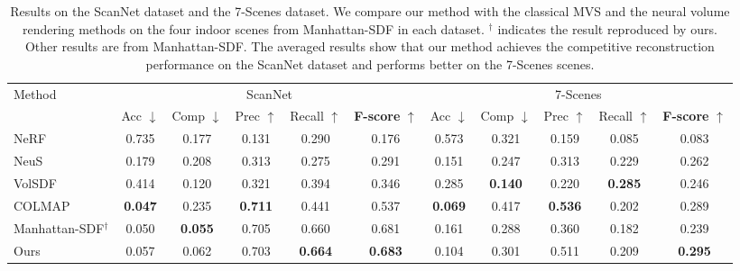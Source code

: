 \documentclass[10pt,journal,compsoc]{IEEEtran}
\begin{document}
\begin{table*}[htbp]
	\centering
	\small
	\renewcommand{\tabcolsep}{1.5ex}
	\caption{Results on the ScanNet dataset and the 7-Scenes dataset. We compare our method with the classical MVS and the neural volume rendering methods on the four indoor scenes from Manhattan-SDF \cite{guo2022neural} in each dataset. $^\dag$ indicates the result reproduced by ours. Other results are from Manhattan-SDF. The averaged results show that our method achieves the competitive reconstruction performance on the ScanNet dataset and performs better on the 7-Scenes scenes.}
	\begin{tabular}{l|ccccc|ccccc}
		\toprule
		\multirow{2}{*}{Method} & \multicolumn{5}{c|}{ScanNet} & \multicolumn{5}{c}{7-Scenes} \\
		\cmidrule{2-11}
		& Acc $\downarrow$ & Comp $\downarrow$ & Prec $\uparrow$ & Recall $\uparrow$ & \textbf{F-score} $\uparrow$ & Acc $\downarrow$ & Comp $\downarrow$ & Prec $\uparrow$ & Recall $\uparrow$ & \textbf{F-score} $\uparrow$ \\
		\midrule
		NeRF \cite{mildenhall2021nerf}    & 0.735 & 0.177 & 0.131 & 0.290 & 0.176 & 0.573 & 0.321 & 0.159 & 0.085 & 0.083 \\
		NeuS \cite{wang2021neus}          & 0.179 & 0.208 & 0.313 & 0.275 & 0.291 & 0.151 & 0.247 & 0.313 & 0.229 & 0.262 \\
		VolSDF \cite{yariv2021volume}     & 0.414 & 0.120 & 0.321 & 0.394 & 0.346 & 0.285  & \textbf{0.140} & 0.220 & \textbf{0.285} & 0.246 \\
		COLMAP \cite{schoenberger2016sfm} & \textbf{0.047} & 0.235 & \textbf{0.711} & 0.441 & 0.537 & \textbf{0.069} & 0.417 & \textbf{0.536} & 0.202 & 0.289 \\
		Manhattan-SDF$^\dag$ \cite{guo2022neural} & 0.050 & \textbf{0.055} & 0.705 & 0.660 & 0.681 & 0.161 & 0.288 & 0.360 & 0.182 & 0.239 \\
		\midrule
		Ours                 & 0.057 & 0.062 & 0.703 & \textbf{0.664} & \textbf{0.683} & 0.104 & 0.301 & 0.511 & 0.209 & \textbf{0.295} \\
		\bottomrule
	\end{tabular}
	\label{tab:ori_scenes}
\end{table*}
\end{document}

